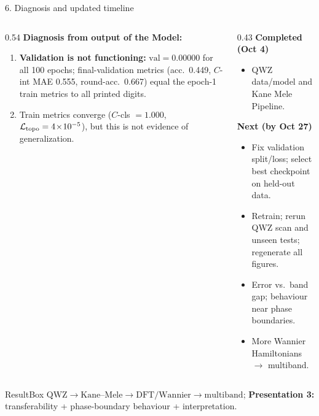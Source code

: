 \documentclass[aspectratio=169,11pt]{beamer}
\newenvironment{ResultBox}
{\begin{beamercolorbox}[rounded=true,sep=0.40em]{ResultBox}}
{\end{beamercolorbox}}
\begin{document}
\begin{frame}{6. Diagnosis and updated timeline}
\footnotesize

\begin{columns}[T]
\begin{column}{0.54\textwidth}
\textbf{Diagnosis from output of the Model: }
\begin{enumerate}
    \item \textbf{Validation is not functioning:} $\mathrm{val}=0.00000$ for all
    100 epochs; final-validation metrics (acc.\ 0.449, $C$-int MAE 0.555,
    round-acc.\ 0.667) equal the epoch-1 train metrics to all printed digits.
    \item Train metrics converge ($C$-cls $=1.000$, $\mathcal L_{\rm topo}=4\!\times\!10^{-5}$),
    but this is not evidence of generalization.
\end{enumerate}
\end{column}

\begin{column}{0.43\textwidth}
\textbf{Completed (Oct 4)}
\begin{itemize}
    \item QWZ data/model and Kane Mele Pipeline.
\end{itemize}

\textbf{Next (by Oct 27)}
\begin{itemize}
    \item Fix validation split/loss; select best checkpoint on held-out data.
    \item Retrain; rerun QWZ scan and unseen tests; regenerate all figures.
    \item Error vs.\ band gap; behaviour near phase boundaries.
    \item More Wannier Hamiltonians $\rightarrow$ multiband.
\end{itemize}
\end{column}
\end{columns}

\vspace{0.08cm}
\begin{ResultBox}\scriptsize\centering
$\mathrm{QWZ}\rightarrow\mathrm{Kane\text{--}Mele}\rightarrow\mathrm{DFT/Wannier}\rightarrow\mathrm{multiband}$;
\textbf{Presentation 3:} transferability + phase-boundary behaviour + interpretation.
\end{ResultBox}
\end{frame}
\end{document}
